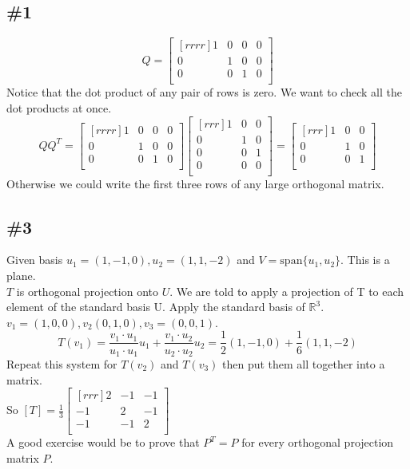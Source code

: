 \documentclass{report}
\begin{document}
\subsection{\#1}
\[ Q=\begin{bmatrix}[rrrr]1&0&0&0\\0&1&0&0\\0&0&1&0\\\end{bmatrix} \]
Notice that the dot product of any pair of rows is zero. We want to check all the dot products at once.
\[ QQ^T=\begin{bmatrix}[rrrr]1&0&0&0\\0&1&0&0\\0&0&1&0\\\end{bmatrix}\begin{bmatrix}[rrr]1&0&0\\0&1&0\\0&0&1\\0&0&0\\\end{bmatrix}=\begin{bmatrix}[rrr]1&0&0\\0&1&0\\0&0&1\\\end{bmatrix} \]
Otherwise we could write the first three rows of any large orthogonal matrix.

\subsection{\#3}
Given basis $u_1=(1,-1,0),u_2=(1,1,-2)$ and $V=\mathrm{span}\{u_1,u_2\}$. This is a plane.\\
$T$ is orthogonal projection onto $U$. We are told to apply a projection of T to each element of the standard basis U. Apply the standard basis of $\mathbb{R}^3$.\\
$v_1=(1,0,0),v_2(0,1,0),v_3=(0,0,1)$.\\
\[ T(v_1)=\frac{v_1\cdot u_1}{u_1\cdot u_1}u_1+\frac{v_1\cdot u_2}{u_2\cdot u_2}u_2 = \frac{1}{2}(1,-1,0) + \frac{1}{6}(1,1,-2) \]
Repeat this system for $T(v_2)$ and $T(v_3)$ then put them all together into a matrix.\\
So $[T]=\frac{1}{3}\begin{bmatrix}[rrr]2&-1&-1\\-1&2&-1\\-1&-1&2\\\end{bmatrix}$\\
A good exercise would be to prove that $P^T=P$ for every orthogonal projection matrix $P$.
\end{document}

